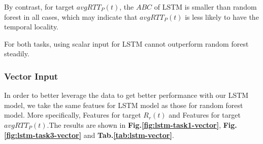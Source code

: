 \documentclass[sigconf]{acmart}
\begin{document}
	By contrast, for target $avgRTT_P(t)$, the $ABC$ of LSTM is smaller than random forest in all cases, which may indicate that $avgRTT_P(t)$ is less likely to have the temporal locality.
	
	For both tasks, using scalar input for LSTM cannot outperform random forest steadily.
	
	\subsubsection{Vector Input}
	In order to better leverage the data to get better performance with our LSTM model, we take the same featues for LSTM model as those for random forest model. More specifically, Features for target $R_r(t)$ and Features for target $avgRTT_P(t)$.The results are shown in \textbf{Fig.\ref{fig:lstm-task1-vector}}, \textbf{Fig.\ref{fig:lstm-task3-vector}} and \textbf{Tab.\ref{tab:lstm-vector}}.
	
\end{document}
